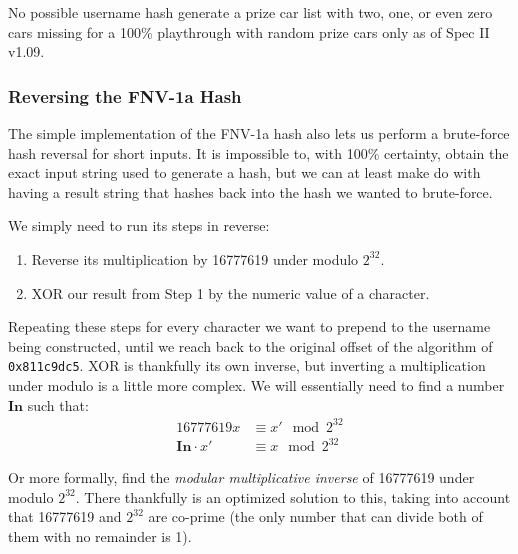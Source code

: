 \documentclass[14pt,a4paper,notitlepage]{extarticle}
\begin{document}
                No possible username hash generate a prize car list with two, one,
                or even zero cars missing for a 100\% playthrough with random prize cars only
                as of Spec II v1.09.

            \subsubsection*{Reversing the FNV-1a Hash}
                The simple implementation of the FNV-1a hash also lets us perform a brute-force hash
                reversal for short inputs. It is impossible to, with 100\% certainty, obtain the exact
                input string used to generate a hash, but we can at least make do with having a result
                string that hashes back into the hash we wanted to brute-force.

                We simply need to run its steps in reverse:

                \begin{enumerate}
                    \item Reverse its multiplication by 16777619 under modulo $2^{32}$.
                    \item XOR our result from Step 1 by the numeric value of a character.
                \end{enumerate}

                Repeating these steps for every character we want to prepend to the
                username being constructed, until we reach back to the original offset
                of the algorithm of \texttt{0x811c9dc5}.
                XOR is thankfully its own inverse, but
                inverting a multiplication under modulo is a little more complex.
                We will essentially need to find a number $\mathbf{In}$ such that:
                \begin{align*}
                    16777619x &\equiv x' \mod 2^{32}\\
                    \mathbf{In} \cdot x' &\equiv x \mod 2^{32}
                \end{align*}

                Or more formally, find the \textit{modular multiplicative inverse} of
                16777619 under modulo $2^{32}$. There thankfully is an optimized solution
                to this, taking into account that 16777619 and $2^{32}$ are co-prime
                (the only number that can divide both of them with no remainder is 1).
\end{document}
